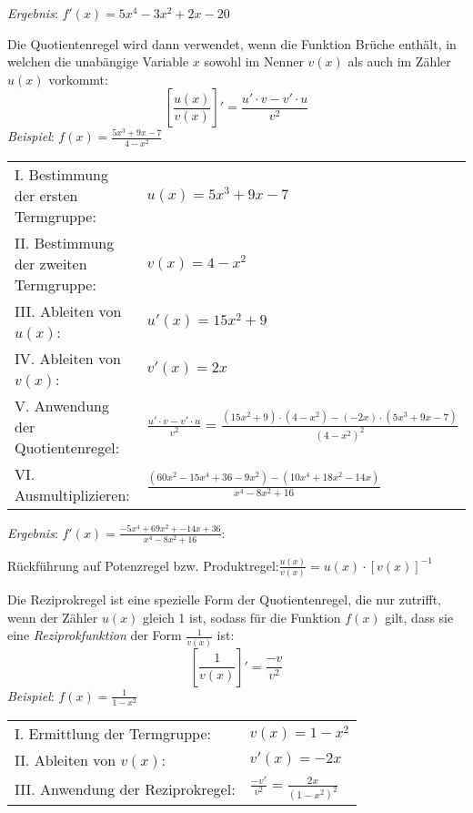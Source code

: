 \emph{Ergebnis}: $f'(x) = 5x^4 - 3x^2 + 2x - 20$

\pagebreak


Die Quotientenregel wird dann verwendet, wenn die Funktion Br\"{u}che enth\"{a}lt, in welchen die unab\"{a}ngige Variable $x$ sowohl im Nenner $v(x)$ als auch im Z\"{a}hler $u(x)$ vorkommt: $$\left[\frac{u(x)}{v(x)}\right]' = \frac{u' \cdot v - v' \cdot u}{v^2}$$
\emph{Beispiel}: $f(x) = \frac{5x^3 + 9x - 7}{4-x^2}$

\begin{tabular}{l l}
	I. Bestimmung der ersten Termgruppe: & $u(x) = 5x^3 + 9x - 7$
	\extrapar \\
	II. Bestimmung der zweiten Termgruppe: & $v(x) = 4 - x^2$
	\extrapar \\
	III. Ableiten von $u(x)$: & $u'(x) = 15x^2 + 9$
	\extrapar \\
	IV. Ableiten von $v(x)$: & $v'(x) = 2x$
	\extrapar \\
	V. Anwendung der Quotientenregel: & $\frac{u' \cdot v - v' \cdot u}{v^2} = \frac{(15x^2 + 9) \cdot (4-x^2) - (-2x) \cdot (5x^3 + 9x - 7)}{(4-x^2)^2}$
	\extrapar \\
	VI. Ausmultiplizieren: & $\frac{(60x^2 - 15x^4 + 36 - 9x^2) - (10x^4 + 18x^2 - 14x)}{x^4 - 8x^2 + 16}$
\end{tabular}

\emph{Ergebnis}: $f'(x) = \frac{-5x^4 + 69x^2 + -14x + 36}{x^4 - 8x^2 + 16}$:

R\"{u}ckf\"{u}hrung auf Potenzregel bzw. Produktregel:\hspace{1cm}$\frac{u(x)}{v(x)} = u(x) \cdot [v(x)]^{-1}$


Die Reziprokregel ist eine spezielle Form der Quotientenregel, die nur zutrifft, wenn der Z\"{a}hler $u(x)$ gleich 1 ist, sodass f\"{u}r die Funktion $f(x)$ gilt, dass sie eine \emph{Reziprokfunktion} der Form $\frac{1}{v(x)}$ ist: $$\left[\frac{1}{v(x)}\right]' = \frac{-v}{v^2}$$
\emph{Beispiel}: $f(x) = \frac{1}{1 - x^2}$

\begin{tabular}{l l}
	I. Ermittlung der Termgruppe: & $v(x) = 1 - x^2$
	\extrapar \\
	II. Ableiten von $v(x)$: & $v'(x) = -2x$
	\extrapar \\
	III. Anwendung der Reziprokregel: & $\frac{-v'}{v^2} = \frac{2x}{(1-x^2)^2}$
\end{tabular}

